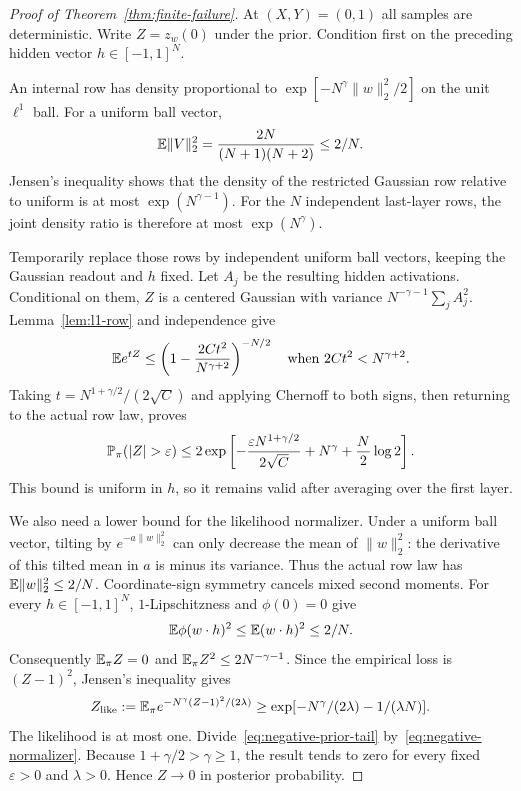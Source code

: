 \begin{proof}[Proof of Theorem~\ref{thm:finite-failure}]
At $(X,Y)=(0,1)$ all samples are deterministic. Write $Z=z_w(0)$ under the prior. Condition first on the preceding hidden vector $h\in[-1,1]^N$.

An internal row has density proportional to
$\exp[-N^\gamma\|w\|_2^2/2]$ on the unit $\ell^1$ ball. For a uniform ball vector,
\[
 \mathbb E\|V\|_2^2=\frac{2N}{(N+1)(N+2)}\leq2/N.
\]
Jensen's inequality shows that the density of the restricted Gaussian row relative to uniform is at most $\exp(N^{\gamma-1})$. For the $N$ independent last-layer rows, the joint density ratio is therefore at most $\exp(N^\gamma)$.

Temporarily replace those rows by independent uniform ball vectors, keeping the Gaussian readout and $h$ fixed. Let $A_j$ be the resulting hidden activations. Conditional on them, $Z$ is a centered Gaussian with variance $N^{-\gamma-1}\sum_jA_j^2$. Lemma~\ref{lem:l1-row} and independence give
\[
 \mathbb E e^{tZ}
 \leq\left(1-\frac{2Ct^2}{N^{\gamma+2}}\right)^{-N/2}
 \quad\text{when }2Ct^2<N^{\gamma+2}.
\]
Taking $t=N^{1+\gamma/2}/(2\sqrt C)$ and applying Chernoff to both signs, then returning to the actual row law, proves
\begin{equation}
 \Prob_{\pi}(|Z|>\varepsilon)
 \leq2\exp\left[-\frac{\varepsilon N^{1+\gamma/2}}{2\sqrt C}
                     +N^\gamma+\frac N2\log2\right].
 \label{eq:negative-prior-tail}
\end{equation}
This bound is uniform in $h$, so it remains valid after averaging over the first layer.

We also need a lower bound for the likelihood normalizer. Under a uniform ball vector, tilting by $e^{-a\|w\|_2^2}$ can only decrease the mean of $\|w\|_2^2$: the derivative of this tilted mean in $a$ is minus its variance. Thus the actual row law has $\mathbb E\|w\|_2^2\leq2/N$. Coordinate-sign symmetry cancels mixed second moments. For every $h\in[-1,1]^N$, $1$-Lipschitzness and $\phi(0)=0$ give
\[
 \mathbb E\phi(w\cdot h)^2\leq\mathbb E(w\cdot h)^2\leq2/N.
\]
Consequently $\mathbb E_\pi Z=0$ and $\mathbb E_\pi Z^2\leq2N^{-\gamma-1}$.
Since the empirical loss is $(Z-1)^2$, Jensen's inequality gives
\begin{equation}
 Z_{\rm like}:=\mathbb E_\pi e^{-N^\gamma(Z-1)^2/(2\lambda)}
 \geq\exp[-N^\gamma/(2\lambda)-1/(\lambda N)].
 \label{eq:negative-normalizer}
\end{equation}
The likelihood is at most one. Divide~\eqref{eq:negative-prior-tail} by~\eqref{eq:negative-normalizer}. Because $1+\gamma/2>\gamma\geq1$, the result tends to zero for every fixed $\varepsilon>0$ and $\lambda>0$. Hence $Z\to0$ in posterior probability.


\end{proof}
